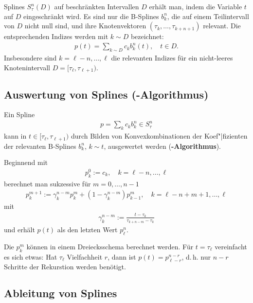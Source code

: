 Splines $S_\tau^n(D)$ auf beschränkten Intervallen $D$ erhält man, indem die
Variable $t$ auf $D$ eingeschränkt wird.
Es sind nur die B-Splines $b_k^n$, die auf einem Teilintervall von $D$ nicht
null sind, und ihre Knotenvektoren $(\tau_k, \dotsc, \tau_{k+n+1})$ relevant.
Die entsprechenden Indizes werden mit $k \sim D$ bezeichnet:
\begin{align*}
    p(t) = \sum_{k \sim D} c_k b_k^n(t), \quad t \in D.
\end{align*}
Insbesondere sind $k = \ell - n, \dotsc, \ell$ die relevanten Indizes für ein
nicht-leeres Knotenintervall $D = [\tau_\ell, \tau_{\ell+1})$.

\subsection{%
    Auswertung von Splines (-Algorithmus)%
}

Ein Spline
\begin{align*}
    p = \sum_k c_k b_k^n \in S_\tau^n
\end{align*}
kann in $t \in [\tau_\ell, \tau_{\ell+1})$ durch Bilden von Konvexkombinationen
der Koef"|fizienten der relevanten B-Splines $b_k^n$, $k \sim t$,
ausgewertet werden
(\textbf{-Algorithmus}).

Beginnend mit
\begin{align*}
    p_k^0 := c_k, \quad
    k = \ell - n, \dotsc, \ell
\end{align*}
berechnet man sukzessive für $m = 0, \dotsc, n - 1$
\begin{align*}
    p_k^{m+1} := \gamma_k^{n-m} p_k^m + (1 - \gamma_k^{n-m}) p_{k-1}^m, \quad
    k = \ell - n + m + 1, \dotsc, \ell
\end{align*}
mit
\begin{align*}
    \gamma_k^{n-m} := \frac{t - \tau_k}{\tau_{k+n-m} - \tau_k}
\end{align*}
und erhält $p(t)$ als den letzten Wert $p_\ell^n$.

\linie

Die $p_k^m$ können in einem Dreiecksschema berechnet werden.
Für $t = \tau_\ell$ vereinfacht es sich etwas:
Hat $\tau_\ell$ Vielfachheit $r$, dann ist $p(t) = p_{\ell-r}^{n-r}$, d.\,h.
nur $n - r$ Schritte der Rekurstion werden benötigt.

\pagebreak

\subsection{%
    Ableitung von Splines%
}

